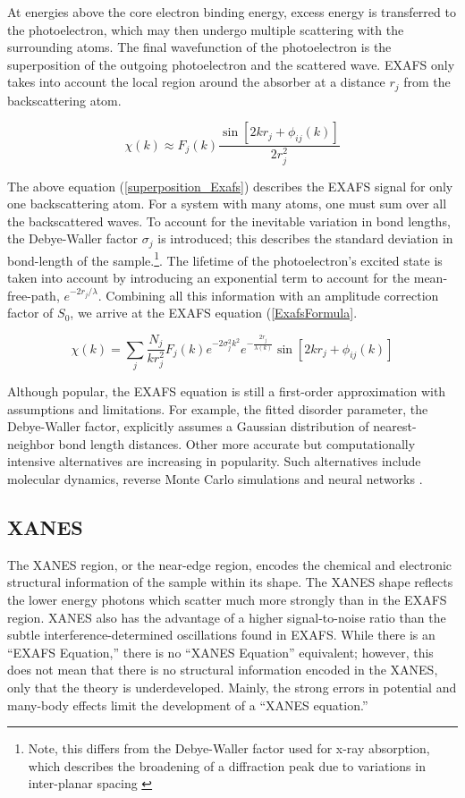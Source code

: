 At energies above the core electron binding energy, excess energy is transferred to the photoelectron, which may then undergo multiple scattering with the surrounding atoms. The final wavefunction of the photoelectron is the superposition of the outgoing photoelectron and the scattered wave. EXAFS only takes into account the local region around the absorber at a distance $ r_j $  from the backscattering atom.

\begin{equation}
    \label{superposition_Exafs}
    \chi(k) \approx F_j(k) \dfrac{\sin[2kr_j + \phi_{ij}(k)]}{2r_j^2}
\end{equation}

The above equation (\ref{superposition_Exafs}) describes the EXAFS signal for only one backscattering atom. For a system with many atoms, one must sum over all the backscattered waves. To account for the inevitable variation in bond lengths, the Debye-Waller factor $ \sigma_j $ is introduced; this describes the standard deviation in bond-length of the sample.\footnote{Note, this differs from the Debye-Waller factor used for x-ray absorption, which describes the broadening of a diffraction peak due to variations in inter-planar spacing \cite{DW-diffraction}}. The lifetime of the photoelectron's excited state is taken into account by introducing an exponential term to account for the mean-free-path, $ e^{-2r_j/\lambda} $. Combining all this information with an amplitude correction factor of $ S_0 $, we arrive at the EXAFS equation (\ref{ExafsFormula}. 

\begin{equation}
    \label{ExafsFormula}
    \chi(k) = \sum_j \frac{N_j}{kr_j^2}F_j(k)e^{-2\sigma_j^2k^2}e^{-\tfrac{2r_j}{\lambda(k)}}\sin[2kr_j + \phi_{ij}(k)]
\end{equation}

Although popular, the EXAFS equation is still a first-order approximation with assumptions and limitations. For example, the fitted disorder parameter, the Debye-Waller factor, explicitly assumes a Gaussian distribution of nearest-neighbor bond length distances. Other more accurate but computationally intensive alternatives are increasing in popularity. Such alternatives include molecular dynamics, reverse Monte Carlo simulations and neural networks \cite{lin2020machine} \cite{timoshenko2018neural}.

\subsection{XANES}
The XANES region, or the near-edge region, encodes the chemical and electronic structural information of the sample within its shape. The XANES shape reflects the lower energy photons which scatter much more strongly than in the EXAFS region. XANES also has the advantage of a higher signal-to-noise ratio than the subtle interference-determined oscillations found in EXAFS. While there is an ``EXAFS Equation,'' there is no ``XANES Equation'' equivalent; however, this does not mean that there is no structural information encoded in the XANES, only that the theory is underdeveloped. Mainly, the strong errors in potential and many-body effects limit the development of a ``XANES equation.'' 


